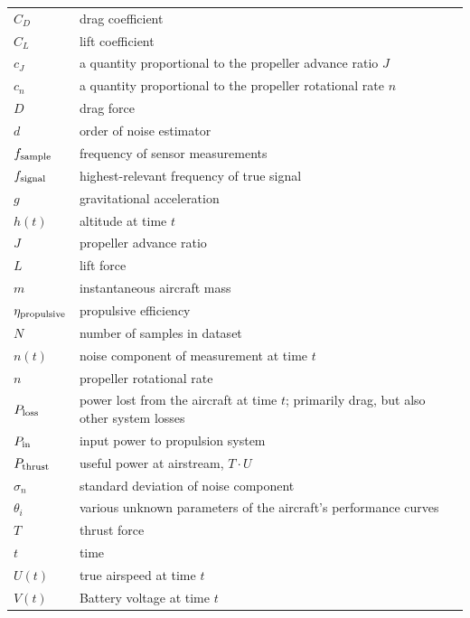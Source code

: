 \documentclass[conf]{new-aiaa}
\begin{document}
    {\renewcommand\arraystretch{1.0}
    \noindent\begin{longtable*}{@{}l @{\quad=\quad} l@{}}
                 $C_D$ & drag coefficient \\
                 $C_L$ & lift coefficient \\
                 $c_J$ & a quantity proportional to the propeller advance ratio $J$ \\
                 $c_n$ & a quantity proportional to the propeller rotational rate $n$ \\
                 $D$ & drag force \\
                 $d$ & order of noise estimator\\
                 $f_{\rm sample}$ & frequency of sensor measurements \\
                 $f_{\rm signal}$ & highest-relevant frequency of true signal \\
                 $g$ & gravitational acceleration \\
                 $h(t)$ & altitude at time $t$ \\
                 $J$ & propeller advance ratio \\
                 $L$ & lift force \\
                 $m$ & instantaneous aircraft mass \\
                 $\eta_{\rm propulsive}$ & propulsive efficiency \\
                 $N$ & number of samples in dataset \\
                 $n(t)$ & noise component of measurement at time $t$ \\
                 $n$ & propeller rotational rate \\
                 $P_{\rm loss}$ & power lost from the aircraft at time $t$; primarily drag, but also other system losses\\
                 $P_{\rm in}$ & input power to propulsion system \\
                 $P_{\rm thrust}$ & useful power at airstream, $T \cdot U$\\
                 $\sigma_n$ & standard deviation of noise component \\
                 $\theta_i$ & various unknown parameters of the aircraft's performance curves\\
                 $T$ & thrust force \\
                 $t$ & time \\
                 $U(t)$ & true airspeed at time $t$ \\
                 $V(t)$ & Battery voltage at time $t$ \\
    \end{longtable*}}
\end{document}

